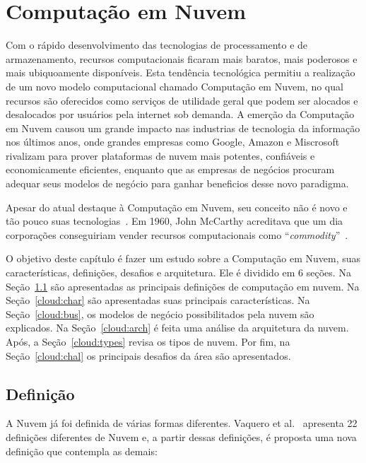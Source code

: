 \chapter{Computação em Nuvem}

Com o rápido desenvolvimento das tecnologias de processamento e de armazenamento, recursos computacionais ficaram mais baratos, mais poderosos e mais ubiquoamente disponíveis. Esta tendência tecnológica permitiu a realização de um novo modelo computacional chamado Computação em Nuvem, no qual recursos são oferecidos como serviços de utilidade geral que podem ser alocados e desalocados por usuários pela internet sob demanda. A emerção da Computação em Nuvem causou um grande impacto nas industrias de tecnologia da informação nos últimos anos, onde grandes empresas como Google, Amazon e Miscrosoft rivalizam para prover plataformas de nuvem mais potentes, confiáveis e economicamente eficientes, enquanto que as empresas de negócios procuram adequar seus modelos de negócio para ganhar beneficios desse novo paradigma.

Apesar do atual destaque à Computação em Nuvem,
 seu conceito não é novo e tão pouco suas
tecnologias~\cite{CloudUncovered:2012}. Em 1960, John McCarthy acreditava que um dia corporações conseguiriam vender recursos computacionais como ``\emph{commodity}''~\cite{demystifingCloud:2011}.

O objetivo deste capítulo é fazer um estudo sobre a Computação em Nuvem, suas características, definições, desafios e arquitetura. Ele é dividido em 6 seções. Na Seção~\ref{cloud:def} são apresentadas as
principais definições de computação em nuvem. Na Seção~\ref{cloud:char} são
apresentadas suas principais características. Na Seção~\ref{cloud:bus}, os modelos de
negócio possibilitados pela nuvem são explicados. Na Seção~\ref{cloud:arch} é feita uma
análise da arquitetura da nuvem. Após, a Seção~\ref{cloud:types} revisa os
tipos de nuvem. Por fim, na Seção~\ref{cloud:chal} os principais desafios da área são
apresentados.

\section{Definição} \label{cloud:def}

A Nuvem já foi definida de várias formas diferentes. Vaquero et al.~\citeyearpar{CloudDefinition:2009} apresenta 22  definições diferentes de Nuvem e, a partir dessas definições, é proposta uma nova definição que contempla as demais:
	
